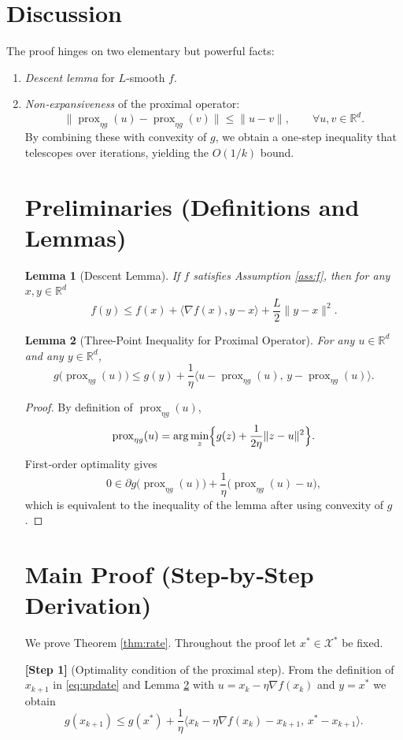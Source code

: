 \documentclass{article}
\newtheorem{lemma}{Lemma}
\newcommand{\prox}{\operatorname{prox}}
\newcommand{\R}{\mathbb{R}}
\begin{document}
\section*{Discussion}
The proof hinges on two elementary but powerful facts:
\begin{enumerate}
\item \emph{Descent lemma} for $L$‑smooth $f$.
\item \emph{Non‑expansiveness} of the proximal operator:
\[
\|\prox_{\eta g}(u)-\prox_{\eta g}(v)\|\le\|u-v\|,\qquad\forall u,v\in\R^{d}.
\tag{NE}
\]
By combining these with convexity of $g$, we obtain a one‑step inequality that telescopes over iterations, yielding the $O(1/k)$ bound.

\newpage

\section*{Preliminaries (Definitions and Lemmas)}
\begin{lemma}[Descent Lemma]\label{lem:descent}
If $f$ satisfies Assumption \ref{ass:f}, then for any $x,y\in\R^{d}$
\[
f(y)\le f(x)+\langle\nabla f(x),y-x\rangle+\frac{L}{2}\|y-x\|^{2}.
\]
\end{lemma}
\begin{lemma}[Three‑Point Inequality for Proximal Operator]\label{lem:prox3}
For any $u\in\R^{d}$ and any $y\in\R^{d}$,
\[
g\bigl(\prox_{\eta g}(u)\bigr)\le g(y)+\frac{1}{\eta}\langle u-\prox_{\eta g}(u),\,y-\prox_{\eta g}(u)\rangle.
\]
\end{lemma}
\begin{proof}
By definition of $\prox_{\eta g}(u)$,
\[
\prox_{\eta g}(u)=\arg\min_{z}\Bigl\{g(z)+\frac{1}{2\eta}\|z-u\|^{2}\Bigr\}.
\]
First‑order optimality gives
\[
0\in\partial g\bigl(\prox_{\eta g}(u)\bigr)+\frac{1}{\eta}\bigl(\prox_{\eta g}(u)-u\bigr),
\]
which is equivalent to the inequality of the lemma after using convexity of $g$.\qedhere
\end{proof}

\section*{Main Proof (Step‑by‑Step Derivation)}
We prove Theorem \ref{thm:rate}. Throughout the proof let $x^{*}\in\mathcal{X}^{*}$ be fixed.

\noindent\textbf{[Step 1]} (Optimality condition of the proximal step).  
From the definition of $x_{k+1}$ in \eqref{eq:update} and Lemma \ref{lem:prox3} with $u=x_{k}-\eta\nabla f(x_{k})$ and $y=x^{*}$ we obtain
\begin{equation}
g(x_{k+1})\le g(x^{*})+\frac{1}{\eta}\big\langle x_{k}-\eta\nabla f(x_{k})-x_{k+1},\,x^{*}-x_{k+1}\big\rangle.
\label{eq:prox-ineq}
\end{equation}


\end{enumerate}
\end{document}
